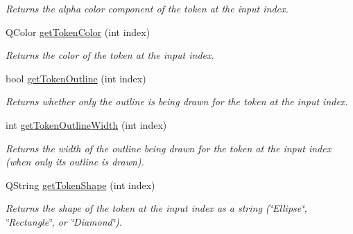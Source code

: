 \begin{DoxyCompactItemize}
\begin{DoxyCompactList}\small\item\em Returns the alpha color component of the token at the input index. \end{DoxyCompactList}\item 
\hypertarget{class_picto_1_1_token_factory_graphic_a661391243d9cd9b3489ec005b80a1d6d}{Q\-Color \hyperlink{class_picto_1_1_token_factory_graphic_a661391243d9cd9b3489ec005b80a1d6d}{get\-Token\-Color} (int index)}\label{class_picto_1_1_token_factory_graphic_a661391243d9cd9b3489ec005b80a1d6d}

\begin{DoxyCompactList}\small\item\em Returns the color of the token at the input index. \end{DoxyCompactList}\item 
\hypertarget{class_picto_1_1_token_factory_graphic_aaa7d696928e1ed21985787cac9c279be}{bool \hyperlink{class_picto_1_1_token_factory_graphic_aaa7d696928e1ed21985787cac9c279be}{get\-Token\-Outline} (int index)}\label{class_picto_1_1_token_factory_graphic_aaa7d696928e1ed21985787cac9c279be}

\begin{DoxyCompactList}\small\item\em Returns whether only the outline is being drawn for the token at the input index. \end{DoxyCompactList}\item 
\hypertarget{class_picto_1_1_token_factory_graphic_a79437994b4ea3e233689bca72f154d94}{int \hyperlink{class_picto_1_1_token_factory_graphic_a79437994b4ea3e233689bca72f154d94}{get\-Token\-Outline\-Width} (int index)}\label{class_picto_1_1_token_factory_graphic_a79437994b4ea3e233689bca72f154d94}

\begin{DoxyCompactList}\small\item\em Returns the width of the outline being drawn for the token at the input index (when only its outline is drawn). \end{DoxyCompactList}\item 
\hypertarget{class_picto_1_1_token_factory_graphic_a207fa6b03f28b02c927397e63c04ceee}{Q\-String \hyperlink{class_picto_1_1_token_factory_graphic_a207fa6b03f28b02c927397e63c04ceee}{get\-Token\-Shape} (int index)}\label{class_picto_1_1_token_factory_graphic_a207fa6b03f28b02c927397e63c04ceee}

\begin{DoxyCompactList}\small\item\em Returns the shape of the token at the input index as a string (\char`\"{}\-Ellipse\char`\"{}, \char`\"{}\-Rectangle\char`\"{}, or \char`\"{}\-Diamond\char`\"{}). \end{DoxyCompactList}\end{DoxyCompactItemize}

